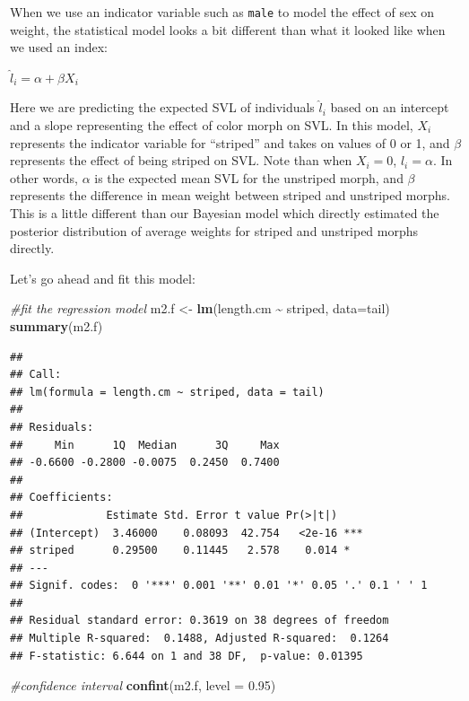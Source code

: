 \documentclass[
]{book}
\newenvironment{Shaded}{\begin{snugshade}}{\end{snugshade}}
\newcommand{\AttributeTok}[1]{\textcolor[rgb]{0.13,0.29,0.53}{#1}}
\newcommand{\CommentTok}[1]{\textcolor[rgb]{0.56,0.35,0.01}{\textit{#1}}}
\newcommand{\FloatTok}[1]{\textcolor[rgb]{0.00,0.00,0.81}{#1}}
\newcommand{\FunctionTok}[1]{\textcolor[rgb]{0.13,0.29,0.53}{\textbf{#1}}}
\newcommand{\NormalTok}[1]{#1}
\newcommand{\OtherTok}[1]{\textcolor[rgb]{0.56,0.35,0.01}{#1}}
\newcommand{\SpecialCharTok}[1]{\textcolor[rgb]{0.81,0.36,0.00}{\textbf{#1}}}
\begin{document}
When we use an indicator variable such as \texttt{male} to model the effect of sex on weight, the statistical model looks a bit different than what it looked like when we used an index:

\(\hat{l}_i = \alpha + \beta X_i\)

Here we are predicting the expected SVL of individuals \(\hat{l}_i\) based on an intercept and a slope representing the effect of color morph on SVL. In this model, \(X_i\) represents the indicator variable for ``striped'' and takes on values of 0 or 1, and \(\beta\) represents the effect of being striped on SVL. Note than when \(X_i = 0\), \(\hat{l}_i = \alpha\). In other words, \(\alpha\) is the expected mean SVL for the unstriped morph, and \(\beta\) represents the difference in mean weight between striped and unstriped morphs. This is a little different than our Bayesian model which directly estimated the posterior distribution of average weights for striped and unstriped morphs directly.

Let's go ahead and fit this model:

\begin{Shaded}
\begin{Highlighting}[]
\CommentTok{\#fit the regression model}
\NormalTok{m2.f }\OtherTok{\textless{}{-}} \FunctionTok{lm}\NormalTok{(length.cm }\SpecialCharTok{\textasciitilde{}}\NormalTok{ striped, }\AttributeTok{data=}\NormalTok{tail)}
\FunctionTok{summary}\NormalTok{(m2.f)}
\end{Highlighting}
\end{Shaded}

\begin{verbatim}
## 
## Call:
## lm(formula = length.cm ~ striped, data = tail)
## 
## Residuals:
##     Min      1Q  Median      3Q     Max 
## -0.6600 -0.2800 -0.0075  0.2450  0.7400 
## 
## Coefficients:
##             Estimate Std. Error t value Pr(>|t|)    
## (Intercept)  3.46000    0.08093  42.754   <2e-16 ***
## striped      0.29500    0.11445   2.578    0.014 *  
## ---
## Signif. codes:  0 '***' 0.001 '**' 0.01 '*' 0.05 '.' 0.1 ' ' 1
## 
## Residual standard error: 0.3619 on 38 degrees of freedom
## Multiple R-squared:  0.1488, Adjusted R-squared:  0.1264 
## F-statistic: 6.644 on 1 and 38 DF,  p-value: 0.01395
\end{verbatim}

\begin{Shaded}
\begin{Highlighting}[]
\CommentTok{\#confidence interval}
\FunctionTok{confint}\NormalTok{(m2.f, }\AttributeTok{level =} \FloatTok{0.95}\NormalTok{)}
\end{Highlighting}
\end{Shaded}
\end{document}
